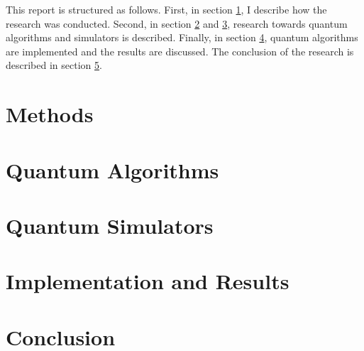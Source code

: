 \documentclass[a4paper,11pt]{article}
\begin{document}
This report is structured as follows. First, in section \ref{sec:methods}, I describe how the research was conducted.
Second, in section \ref{sec:quantum-algorithms} and \ref{sec:quantum-simulators}, research towards quantum algorithms and simulators is described.
Finally, in section \ref{sec:implementation-and-results}, quantum algorithms are implemented and the results are discussed.
The conclusion of the research is described in section \ref{sec:conclusion}.

\section{Methods} \label{sec:methods}

\section{Quantum Algorithms} \label{sec:quantum-algorithms}

\section{Quantum Simulators} \label{sec:quantum-simulators}

\section{Implementation and Results} \label{sec:implementation-and-results}

\section{Conclusion} \label{sec:conclusion}

\printbibliography[heading=bibintoc]
\end{document}
